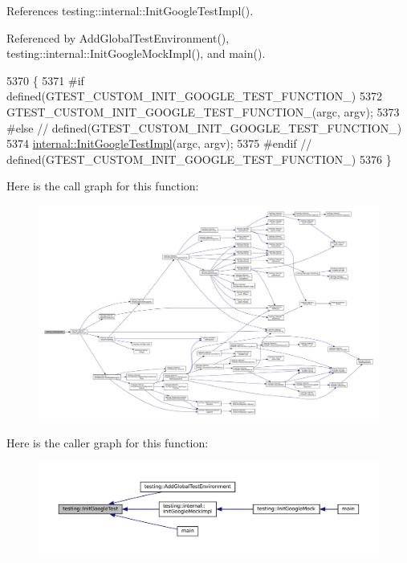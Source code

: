 References testing\+::internal\+::\+Init\+Google\+Test\+Impl().



Referenced by Add\+Global\+Test\+Environment(), testing\+::internal\+::\+Init\+Google\+Mock\+Impl(), and main().


\begin{DoxyCode}
5370                                             \{
5371 \textcolor{preprocessor}{#if defined(GTEST\_CUSTOM\_INIT\_GOOGLE\_TEST\_FUNCTION\_)}
5372   GTEST\_CUSTOM\_INIT\_GOOGLE\_TEST\_FUNCTION\_(argc, argv);
5373 \textcolor{preprocessor}{#else  // defined(GTEST\_CUSTOM\_INIT\_GOOGLE\_TEST\_FUNCTION\_)}
5374   \hyperlink{namespacetesting_1_1internal_ac3c6fa93391768aa91c6238b31aaeeb5}{internal::InitGoogleTestImpl}(argc, argv);
5375 \textcolor{preprocessor}{#endif  // defined(GTEST\_CUSTOM\_INIT\_GOOGLE\_TEST\_FUNCTION\_)}
5376 \}
\end{DoxyCode}
Here is the call graph for this function\+:
\nopagebreak
\begin{figure}[H]
\begin{center}
\leavevmode
\includegraphics[width=350pt]{namespacetesting_afd726ae08c9bd16dc52f78c822d9946b_cgraph}
\end{center}
\end{figure}
Here is the caller graph for this function\+:
\nopagebreak
\begin{figure}[H]
\begin{center}
\leavevmode
\includegraphics[width=350pt]{namespacetesting_afd726ae08c9bd16dc52f78c822d9946b_icgraph}
\end{center}
\end{figure}
\mbox{\label{namespacetesting_ae5a88709a4a7529e30c83242156556b3}} 
